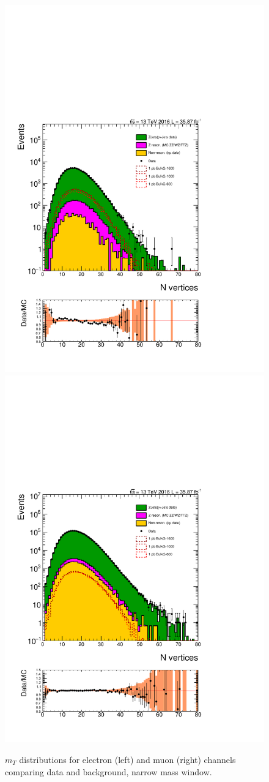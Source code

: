 \begin{figure}[htbp!]
\centering
\includegraphics[width=0.46\linewidth,page=5]{figures/ReMiniSummer16_DT_PhReMiniMCRcFixXsec_GMCPhPtWt_tightzpt50_puWeightsummer16_muoneg_gjet_metfilter_unblind_el_log_1pb.pdf}
\includegraphics[width=0.46\linewidth,page=5]{figures/ReMiniSummer16_DT_PhReMiniMCRcFixXsec_GMCPhPtWt_tightzpt50_puWeightsummer16_muoneg_gjet_metfilter_unblind_mu_log_1pb.pdf}
\caption{$m_T$ distributions for electron (left) and muon (right) channels
comparing data and background,
narrow mass window.}
\label{fig:gjet_mt_narrow}
\end{figure}

